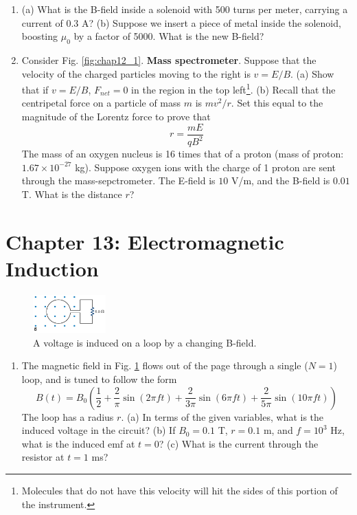 \documentclass[10pt]{article}
\begin{document}
\begin{enumerate}
\item (a) What is the B-field inside a solenoid with 500 turns per meter, carrying a current of 0.3 A? (b) Suppose we insert a piece of metal inside the solenoid, boosting $\mu_0$ by a factor of 5000.  What is the new B-field?  \\ \vspace{3cm}
\item Consider Fig. \ref{fig:chap12_1}.  \textbf{Mass spectrometer}.  Suppose that the 	velocity of the charged particles moving to the right is $v = E/B$.  (a) Show that if $v = E/B$, $F_{net} = 0$ in the region in the top left\footnote{Molecules that do not have this velocity will hit the sides of this portion of the instrument.}.  (b) Recall that the centripetal force on a particle of mass $m$ is $mv^2/r$.  Set this equal to the magnitude of the Lorentz force to prove that 
\begin{equation}
r = \frac{m E}{q B^2}
\end{equation}
The mass of an oxygen nucleus is 16 times that of a proton (mass of proton: $1.67 \times 10^{-27}$ kg).  Suppose oxygen ions with the charge of 1 proton are sent through the mass-sepctrometer.  The E-field is $10$ V/m, and the B-field is $0.01$ T.  What is the distance $r$?
\\ \vspace{1cm}
\end{enumerate}

\section{Chapter 13: Electromagnetic Induction}

\begin{figure}[hb]
\centering
\includegraphics[width=0.25\textwidth]{loopsine.png}
\caption{\label{fig:chap13_1} A voltage is induced on a loop by a changing B-field.}
\end{figure}

\begin{enumerate}
\item The magnetic field in Fig. \ref{fig:chap13_1} flows out of the page through a single ($N=1$) loop, and is tuned to follow the form
\begin{equation}
B(t) = B_0\left( \frac{1}{2} + \frac{2}{\pi}\sin(2\pi f t) + \frac{2}{3\pi}\sin(6\pi f t) + \frac{2}{5\pi}\sin(10\pi f t) \right)
\end{equation}
The loop has a radius $r$.  (a) In terms of the given variables, what is the induced voltage in the circuit? (b) If $B_0 = 0.1$ T, $r = 0.1$ m, and $f = 10^3$ Hz, what is the induced emf at $t=0$?  (c) What is the current through the resistor at $t=1$ ms? \\ \vspace{3cm}
\end{enumerate}
\end{document}
